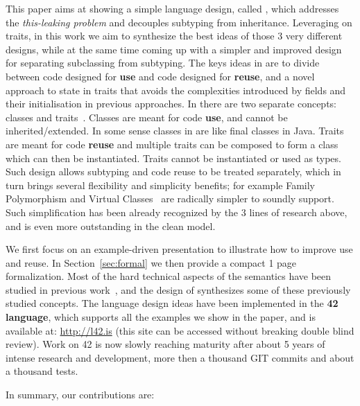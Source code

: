 This paper aims at showing a simple language design, called \name,
which addresses the \emph{this-leaking problem} and decouples subtyping from inheritance.
Leveraging on traits, in this work we aim to synthesize the best ideas
of those 3 very different designs, while at the same time coming up with a simpler and
improved design for separating subclassing from subtyping.
The keys ideas in \name are to divide between code designed for
\textbf{use} and code designed for \textbf{reuse}, and a novel
approach to state in traits that avoids the complexities introduced by
fields and their initialisation in previous approaches.
In \name there are two separate concepts: classes
and traits~\cite{Traits:ECOOP2003}. Classes are meant for code \textbf{use}, and cannot be inherited/extended. In some sense classes in \name are like final classes in
Java. Traits are meant for code \textbf{reuse} and multiple traits can be
composed to form a class which can then be instantiated. Traits 
cannot be instantiated or used as types. Such design allows
subtyping and code reuse to be treated separately, which in turn
brings several flexibility and simplicity benefits; for example Family Polymorphism and Virtual Classes~\cite{ernst2004expression} are radically simpler to soundly support.
Such simplification has been already recognized by the 3 lines of research above, and is even more outstanding in the clean \name model.


We first focus on an example-driven presentation to illustrate how to
improve use and reuse. 
In Section~\ref{sec:formal} we then provide a compact 1 page formalization.
Most of the hard technical aspects of the
semantics have been studied in previous 
work~\cite{Bettini:2010:ISP:1774088.1774530,BETTINI2013521,Bettini2015282,KrogdahlMS09,DBLP:journals/taosd/AxelsenSKM12,DBLP:conf/gpce/AxelsenK12,deep,servetto2014meta,fjig},
and the design of \name synthesizes some of these previously studied
concepts.
The language design ideas have been implemented in the {\bf 42 language}, which supports all
the examples we show in the paper, and is available at: \url{http://l42.is} (this site can be accessed without breaking double blind review).
Work on 42 is now slowly reaching maturity after about 5 years of intense research and development, more then a thousand GIT commits and about a thousand tests.

In summary, our contributions are:


